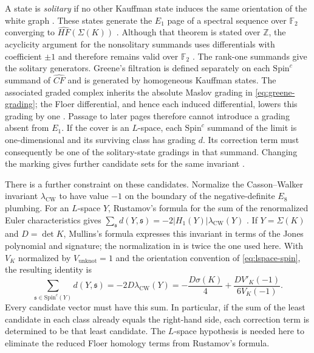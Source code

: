 \documentclass[12pt, oneside]{amsart}
\newcommand{\bbz}{{\mathbb Z}}
\newcommand{\dbc}{\Sigma}
\begin{document}
A state is \emph{solitary} if no other Kauffman state induces the same orientation
of the white graph \cite[Lem.~6.1 and Def.~6.2]{Greene}. These states generate the $E_1$ page
of a spectral sequence over $\mathbb F_2$ converging to $\widehat{HF}(\dbc(K))$
\cite[Thm.~6.8]{Greene}. Although that theorem is stated over $\bbz$, the
acyclicity argument for the nonsolitary summands uses differentials with
coefficient $\pm1$ and therefore remains valid over $\mathbb F_2$
\cite[Lems.~6.6--6.7]{Greene}. The rank-one summands give the solitary
generators. Greene's filtration is defined separately on each
$\mathrm{Spin}^c$ summand of $\widehat{CF}$ and is generated by homogeneous
Kauffman states. The associated graded complex inherits the absolute Maslov
grading in \eqref{eq:greene-grading}; the Floer differential, and hence each induced
differential, lowers this grading by one \cite[Thm.~4.1 and \S6.1]{Greene}.
Passage to later pages therefore cannot introduce a grading absent from $E_1$.
If the cover is an $L$-space, each $\mathrm{Spin}^c$ summand of the limit is
one-dimensional and its surviving class has grading $d$. Its correction term
must consequently be one of the solitary-state gradings in that summand.
Changing the marking gives further candidate sets for the same invariant
\cite[\S7.1]{Greene}.

There is a further constraint on these candidates. Normalize the
Casson--Walker invariant $\lambda_{\mathrm{CW}}$ to have value $-1$ on the
boundary of the negative-definite $E_8$ plumbing. For an $L$-space $Y$,
Rustamov's formula for the sum of the renormalized Euler characteristics
gives $\sum_{\mathfrak s}d(Y,\mathfrak s)=-2|H_1(Y)|\lambda_{\mathrm{CW}}(Y)$
\cite[Thm.~3.3]{Rustamov}. If $Y=\dbc(K)$ and $D=\det K$, Mullins's formula
expresses this invariant in terms of the Jones polynomial and signature;
the normalization in \cite[Thm.~13]{GreeneWatson} is twice the one used here.
With $V_K$ normalized by $V_{\mathrm{unknot}}=1$ and the orientation
convention of \eqref{eq:lspace-spin}, the resulting identity is
\begin{equation}\label{eq:casson-sum}
    \sum_{\mathfrak s\in\mathrm{Spin}^c(Y)}d(Y,\mathfrak s)
    =-2D\lambda_{\mathrm{CW}}(Y)
    =-\frac{D\sigma(K)}4+\frac{D V'_K(-1)}{6V_K(-1)}.
\end{equation}
Every candidate vector must have this sum. In particular, if the sum of the
least candidate in each class already equals the right-hand side, each
correction term is determined to be that least candidate. The $L$-space
hypothesis is needed here to eliminate the reduced Floer homology terms
from Rustamov's formula.
\end{document}
